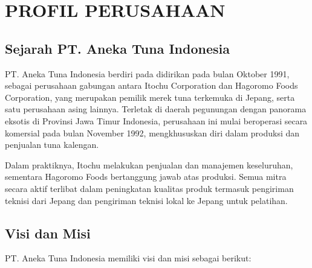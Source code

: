 \chapter{PROFIL PERUSAHAAN}
\vspace{4ex}

\setlength{\parindent}{7ex}


\section{Sejarah PT. Aneka Tuna Indonesia}
\vspace{1ex}

PT. Aneka Tuna Indonesia berdiri pada didirikan pada bulan Oktober 1991, sebagai perusahaan gabungan antara Itochu Corporation dan Hagoromo Foods Corporation, yang merupakan pemilik merek tuna terkemuka di Jepang, serta satu perusahaan asing lainnya.
Terletak di daerah pegunungan dengan panorama eksotis di Provinsi Jawa Timur Indonesia, perusahaan ini mulai beroperasi secara  komersial pada bulan November 1992, mengkhususkan diri dalam produksi dan penjualan tuna kalengan.
\vspace{0.5ex}

Dalam praktiknya, Itochu melakukan penjualan dan manajemen keseluruhan, sementara Hagoromo Foods bertanggung jawab atas produksi.
Semua mitra secara aktif terlibat dalam peningkatan kualitas produk termasuk pengiriman teknisi dari Jepang dan pengiriman teknisi lokal ke Jepang untuk pelatihan.
\vspace{0.5ex}

\section{Visi dan Misi}
\vspace{1ex}

PT. Aneka Tuna Indonesia memiliki visi dan misi sebagai berikut:
\vspace{0.5ex}

